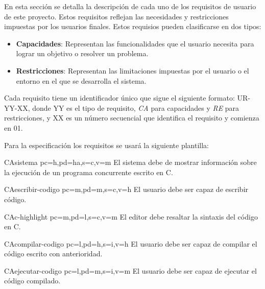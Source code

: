 En esta sección se detalla la descripción de cada uno de los requisitos de usuario de este proyecto. Estos requisitos reflejan las necesidades y restricciones impuestas por los usuarios finales. Estos requisios pueden clasificarse en dos tipos:
\begin{itemize}
    \item \textbf{Capacidades}: Representan las funcionalidades que el usuario necesita para lograr un objetivo o resolver un problema.
    \item \textbf{Restricciones}: Representan las limitaciones impuestas por el usuario o el entorno en el que se desarrolla el sistema.
\end{itemize}

Cada requisito tiene un identificador único que sigue el siguiente formato: UR-YY-XX, donde YY es el tipo de requisito, \textit{CA} para capacidades y \textit{RE} para restricciones, y XX es un número secuencial que identifica el requisito y comienza en 01.

Para la especificación los requisitos se usará la siguiente plantilla:

\printureqtemplate{}

\begin{userReq}{CA}{sistema}
    {pc=h,pd=ha,s=c,v=m}
    El sistema debe de mostrar información sobre la ejecución de un programa concurrente escrito en C.
\end{userReq}

\begin{userReq}{CA}{escribir-codigo}
    {pc=m,pd=m,s=c,v=h}
    El usuario debe ser capaz de escribir código.
\end{userReq}

\begin{userReq}{CA}{c-highlight}
    {pc=m,pd=l,s=c,v=m}
    El editor debe resaltar la sintaxis del código en C.
\end{userReq}

\begin{userReq}{CA}{compilar-codigo}
    {pc=l,pd=h,s=i,v=h}
    El usuario debe ser capaz de compilar el código escrito con anterioridad.
\end{userReq}

\begin{userReq}{CA}{ejecutar-codigo}
    {pc=l,pd=m,s=i,v=m}
    El usuario debe ser capaz de ejecutar el código compilado.
\end{userReq}


